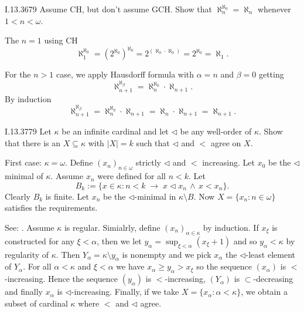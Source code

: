 \begin{lexcopy}{I.13.36}{79}
Assume CH, but don't assume GCH. Show that \(\aleph_n^{\aleph_0} = \aleph_n\)
whenever \(1 < n < \omega\).
\end{lexcopy}
The \(n=1\) using CH
\begin{equation*}
\aleph_1^{\aleph_0} = \left(2^{\aleph_0}\right)^{\aleph_0}
= 2^{(\aleph_0\cdot\aleph_0)} = 2^{\aleph_0} = \aleph_1.
\end{equation*}


For the \(n > 1\) case, 
we apply Hausdorff formula with \(\alpha=n\) and \(\beta = 0\) getting
\begin{equation*}
\aleph_{n+1}^{\aleph_\beta} = \aleph_n^{\aleph_0} \cdot \aleph_{n+1}.
\end{equation*}
By induction
\begin{equation*}
\aleph_{n+1}^{\aleph_\beta}
= \aleph_n^{\aleph_0} \cdot \aleph_{n+1}
= \aleph_n \cdot \aleph_{n+1}
= \aleph_{n+1}.
\end{equation*}

\begin{lexcopy}{I.13.37}{79}
Let \(\kappa\) be an infinite cardinal and let \(\triangleleft\)
be any well-order of \(\kappa\).
Show that there is an \(X \subseteq \kappa\) with \(|X| = k\)
such that \(\triangleleft\) and $<$ agree on $X$.
\end{lexcopy}
First case: \(\kappa = \omega\).
Define \((x_n)_{n\in \omega}\) strictly \(\triangleleft\) and $<$ increasing.
Let \(x_0\) be the \(\triangleleft\) minimal of \(\kappa\).
Assume \(x_n\) were defined for all \(n < k\).
Let
\begin{equation*}
B_k := \{x\in\kappa: n<k\;\to\; x \triangleleft x_n\,\wedge\, x < x_n\}.
\end{equation*}
Clearly \(B_k\) is finite. Let \(x_n\) be the \(\triangleleft\)-minimal
in \(\kappa \setminus B\).
Now \(X=\{x_n: n\in \omega\}\) satisfies the requirements.


See: \cite{WangFrederic}.
Assume \(\kappa\) is regular.
Simialrly, define  \((x_n)_{\alpha \in \kappa}\) by induction.
If \(x_\xi\) is constructed for any \(\xi<\alpha\),
then we let \(y_\alpha = \sup_{\xi<\alpha}(x_\xi+1)\)
and so \(y_\alpha < \kappa\) by regularity of \(\kappa\).
Then \(Y_\alpha =\kappa \setminus y_\alpha\) is nonempty and we pick
\(x_\alpha\) the \(\triangleleft\)-least element of \(Y_\alpha\).
For all \(\alpha<\kappa\) and \(\xi<\alpha\)
we have \(x_\alpha \geq y_\alpha > x_\xi\)
so the sequence \((x_\alpha)\) is $<$-increasing.
Hence the sequence \((y_\alpha)\) is $<$-increasing,
\((Y_\alpha)\) is \(\subset\)-decreasing and finally
\(x_\alpha\) is \(\triangleleft\)-increasing.
Finally, if we take \(X=\{x_\alpha: \alpha<\kappa\}\),
we obtain a subset of cardinal \(\kappa\) where $<$ and \(\triangleleft\) agree.


